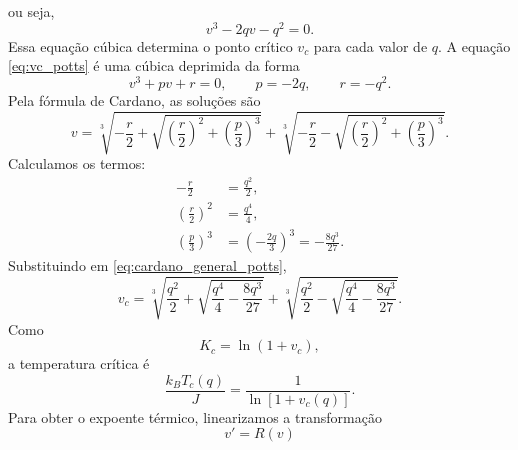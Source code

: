 \documentclass[12pt,a4paper]{article}
\begin{document}
%
ou seja,
%
\begin{equation}
    v^3-2qv-q^2=0.
    \label{eq:vc_potts}
\end{equation}
%
Essa equação cúbica determina o ponto crítico \(v_c\) para cada valor de \(q\). A equação \eqref{eq:vc_potts} é uma cúbica deprimida da forma
%
\begin{equation}
    v^3+pv+r=0,
    \qquad
    p=-2q,
    \qquad
    r=-q^2.
\end{equation}
%
Pela fórmula de Cardano, as soluções são
%
\begin{equation}
    v
    =
    \sqrt[3]{
        -\frac{r}{2}
        +
        \sqrt{
            \left(\frac{r}{2}\right)^2
            +
            \left(\frac{p}{3}\right)^3
        }
    }
    +
    \sqrt[3]{
        -\frac{r}{2}
        -
        \sqrt{
            \left(\frac{r}{2}\right)^2
            +
            \left(\frac{p}{3}\right)^3
        }
    }.
    \label{eq:cardano_general_potts}
\end{equation}
%
Calculamos os termos:
%
\begin{align}
    -\frac{r}{2}
    &=
    \frac{q^2}{2},
    \label{eq:cardano_term1_potts}
    \\[4pt]
    \left(\frac{r}{2}\right)^2
    &=
    \frac{q^4}{4},
    \label{eq:cardano_term2_potts}
    \\[4pt]
    \left(\frac{p}{3}\right)^3
    &=
    \left(-\frac{2q}{3}\right)^3
    =
    -\frac{8q^3}{27}.
    \label{eq:cardano_term3_potts}
\end{align}
%
Substituindo em \eqref{eq:cardano_general_potts},
%
\begin{equation}
    v_c
    =
    \sqrt[3]{
        \frac{q^2}{2}
        +
        \sqrt{
            \frac{q^4}{4}
            -
            \frac{8q^3}{27}
        }
    }
    +
    \sqrt[3]{
        \frac{q^2}{2}
        -
        \sqrt{
            \frac{q^4}{4}
            -
            \frac{8q^3}{27}
        }
    }.
    \label{eq:vc_cardano}
\end{equation}
%
Como
%
\begin{equation}
    K_c=\ln(1+v_c),
\end{equation}
%
a temperatura crítica é
%
\begin{equation}
    \boxed{
    \frac{k_BT_c(q)}{J}
    =
    \frac{1}{\ln[1+v_c(q)]}.
    }
    \label{eq:Tc_q}
\end{equation}
% 
Para obter o expoente térmico, linearizamos a transformação
%
\begin{equation}
    v'=R(v)
\end{equation}
\end{document}
